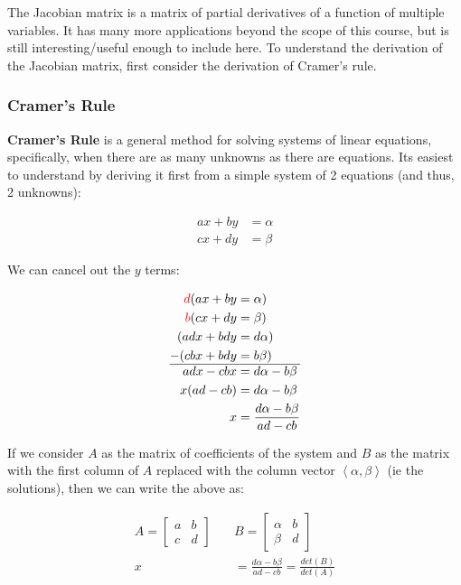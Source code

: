 \documentclass[12pt]{article}
\begin{document}
The Jacobian matrix is a matrix of partial derivatives of a function of multiple variables. It has many more applications beyond the scope of this course, but is still interesting/useful enough to include here. To understand the derivation of the Jacobian matrix, first consider the derivation of Cramer's rule.

\subsubsection{Cramer's Rule}

\textbf{Cramer's Rule} is a general method for solving systems of linear equations, specifically, when there are as many unknowns as there are equations. Its easiest to understand by deriving it first from a simple system of 2 equations (and thus, 2 unknowns):

\begin{equation}
    \begin{split}
        ax + by &= \alpha\\
        cx + dy &= \beta
    \end{split}
\end{equation}

We can cancel out the $y$ terms:

\begin{equation}
    \begin{split}
        \textcolor{red}{d}(ax + by &= \alpha)\\
        \textcolor{red}{b}(cx + dy &= \beta)\\
        (adx + bdy &= d\alpha)\\
        -(cbx + bdy &= b\beta)\\
        \hline
        adx - cbx &= d\alpha - b\beta\\
        x(ad - cb) &= d\alpha - b\beta\\
        x &= \frac{d\alpha - b\beta}{ad - cb}
    \end{split}
\end{equation}

If we consider $A$ as the matrix of coefficients of the system and $B$ as the matrix with the first column of $A$ replaced with the column vector $\left\langle \alpha, \beta \right\rangle$ (ie the solutions), then we can write the above as:

\begin{equation}
    \begin{split}
        A = \begin{bmatrix}
            a & b\\
            c & d
        \end{bmatrix}
        \quad&
        B = \begin{bmatrix}
            \alpha & b\\
            \beta & d
        \end{bmatrix}
        \quad\\
        x &= \frac{d\alpha - b\beta}{ad - cb} = \frac{det(B)}{det(A)}
    \end{split}
\end{equation}
\end{document}
